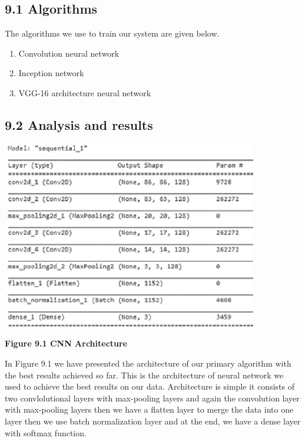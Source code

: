 \documentclass{article} %
\begin{document}
\noindent 
\subsection{9.1 Algorithms}

\noindent The algorithms we use to train our system are given below.

\begin{enumerate}
\item  Convolution neural network

\item  Inception network

\item  VGG-16 architecture neural network
\end{enumerate}

\noindent 
\subsection{9.2 Analysis and results}

\noindent \includegraphics*[width=4.44in, height=3.23in, keepaspectratio=false]{image42}

\noindent \textbf{Figure 9.1 CNN Architecture}

\noindent In Figure 9.1 we have presented the architecture of our primary algorithm with the best results achieved so far. This is the architecture of neural network we used to achieve the best results on our data. Architecture is simple it consists of two convlolutional layers with max-pooling layers and again the convolution layer with max-pooling layers then we have a flatten layer to merge the data into one layer then we use batch normalization layer and at the end, we have a dense layer with softmax function.  
\end{document}
